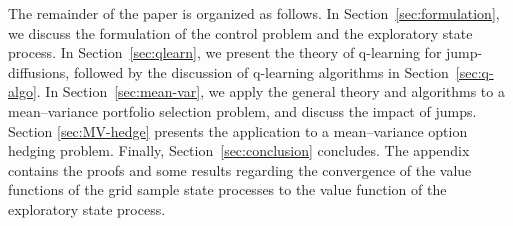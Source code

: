 \documentclass[11pt]{article}
\newcommand{\1}{\mathbbm{1}}
\begin{document}
The remainder of the paper is organized as follows. In Section~\ref{sec:formulation}, we discuss the formulation of the control problem and the exploratory state process. In Section~\ref{sec:qlearn}, we present the theory of q-learning for jump-diffusions, followed by the discussion of q-learning algorithms in Section~\ref{sec:q-algo}. In Section~\ref{sec:mean-var}, we apply the general theory and algorithms to a mean--variance portfolio selection problem, and discuss the impact of jumps. Section \ref{sec:MV-hedge} presents the application to a mean--variance option hedging problem.
Finally, Section~\ref{sec:conclusion} concludes. The appendix contains the proofs and some results regarding the convergence of the value functions of the grid sample state processes to the value function of the exploratory state process.
\end{document}
